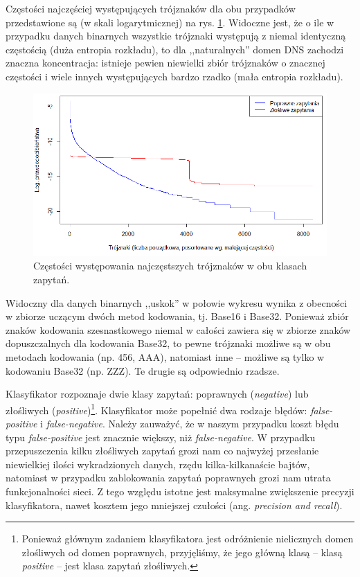 \documentclass{eiti-raport}
\begin{document}
Częstości najczęściej występujących trójznaków dla obu przypadków przedstawione są (w skali logarytmicznej) na rys. \ref{fig:engrams-hist}. Widoczne jest, że o ile w przypadku danych binarnych wszystkie trójznaki występują z niemal identyczną częstością (duża entropia rozkładu), to dla ,,naturalnych'' domen DNS zachodzi znaczna koncentracja: istnieje pewien niewielki zbiór trójznaków o znacznej częstości i wiele innych występujących bardzo rzadko (mała entropia rozkładu). 
\begin{figure}[!h] \centering
	\includegraphics[width=0.9\linewidth]{img/engrams-hist.PNG}
	\caption{Częstości występowania najczęstszych trójznaków w obu klasach zapytań.} \label{fig:engrams-hist}
\end{figure}
Widoczny dla danych binarnych ,,uskok'' w połowie wykresu wynika z obecności w zbiorze uczącym dwóch metod kodowania, tj. Base16 i Base32. Ponieważ zbiór znaków kodowania szesnastkowego niemal w całości zawiera się w zbiorze znaków dopuszczalnych dla kodowania Base32, to pewne trójznaki możliwe są w obu metodach kodowania (np. 456, AAA), natomiast inne -- możliwe są tylko w kodowaniu Base32 (np. ZZZ). Te drugie są odpowiednio rzadsze. 

Klasyfikator rozpoznaje dwie klasy zapytań: poprawnych (\emph{negative}) lub złośliwych (\emph{positive})\footnote{Ponieważ głównym zadaniem klasyfikatora jest odróżnienie nielicznych domen złośliwych od domen poprawnych, przyjęliśmy, że jego główną klasą -- klasą \emph{positive} -- jest klasa zapytań złośliwych.}. Klasyfikator może popełnić dwa rodzaje błędów: \emph{false-positive} i \emph{false-negative}. Należy zauważyć, że w naszym przypadku koszt błędu typu \emph{false-positive} jest znacznie większy, niż \emph{false-negative}. W przypadku przepuszczenia kilku złośliwych zapytań grozi nam co najwyżej przesłanie niewielkiej ilości wykradzionych danych, rzędu kilka-kilkanaście bajtów, natomiast w przypadku zablokowania zapytań poprawnych grozi nam utrata funkcjonalności sieci. Z tego względu istotne jest maksymalne zwiększenie precyzji klasyfikatora, nawet kosztem jego mniejszej czułości (ang. \emph{precision and recall}). 
\end{document}
